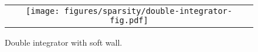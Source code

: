 \vspace{-2mm}
\begin{figure}[htbp]
    \centering
    \begin{minipage}{\columnwidth}
        \centering
        \begin{tabular}{c}
            \begin{minipage}{0.5\columnwidth}
                \centering
                \texttt{[image: figures/sparsity/double-integrator-fig.pdf]}
            \end{minipage}
        \end{tabular}
    \end{minipage}

    \caption{Double integrator with soft wall.
    \label{fig:sp:double-integrator}}
    \vspace{-6mm}
\end{figure}